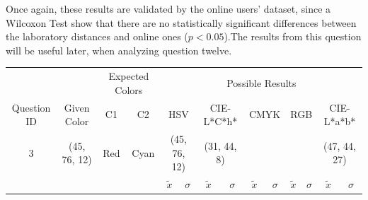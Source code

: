 %
Once again, these results are validated by the online users' dataset, since a Wilcoxon Test show that there are no statistically significant differences between the laboratory
distances and online ones ($p < 0.05$).The results from this question will be useful later, when analyzing question twelve.
%
\begin{table}[H]
  \resizebox{\textwidth}{!} {
  \begin{tabular}{lccccccccccccc}
    \hline
    \multicolumn{1}{c}{}                              &                                      & \multicolumn{2}{c}{Expected Colors}                   & \multicolumn{10}{c}{Possible Results}                                                                                                                                                                                                                                                                                        \\ \cline{3-14}
    \multicolumn{1}{c}{\multirow{-2}{*}{Question ID}} & \multirow{-2}{*}{Given Color}        & C1                       & C2                         & \multicolumn{2}{c}{HSV}                                        & \multicolumn{2}{c}{CIE-L*C*h*}                                 & \multicolumn{2}{c}{CMYK}                                       & \multicolumn{2}{c}{RGB}                                        & \multicolumn{2}{c}{CIE-L*a*b*}                                 \\ \hline
    \multicolumn{1}{c}{3}                             & \cellcolor[HTML]{80FF00}(45, 76, 12) & \multicolumn{1}{c|}{Red} & \multicolumn{1}{c|}{Cyan}  & \multicolumn{2}{c|}{\cellcolor[HTML]{80FF00}(45, 76, 12)}      & \multicolumn{2}{c|}{\cellcolor[HTML]{91C01D}(31, 44, 8)}       & \multicolumn{2}{c|}{\cellcolor[HTML]{808080}{\color[HTML]{FFFFFF}(21, 22, 24)}}       & \multicolumn{2}{c|}{\cellcolor[HTML]{808080}{\color[HTML]{FFFFFF}(21, 22, 24)}}       & \multicolumn{2}{c|}{\cellcolor[HTML]{DDA581}(47, 44, 27)}       \\ \hline
                                                      & \multicolumn{1}{l}{}                 & \multicolumn{1}{l}{}     & \multicolumn{1}{l}{}       & \multicolumn{1}{c}{$\tilde{x}$} & \multicolumn{1}{c}{$\sigma$} & \multicolumn{1}{c}{$\tilde{x}$} & \multicolumn{1}{c}{$\sigma$} & \multicolumn{1}{c}{$\tilde{x}$} & \multicolumn{1}{c}{$\sigma$} & \multicolumn{1}{c}{$\tilde{x}$} & \multicolumn{1}{c}{$\sigma$} & \multicolumn{1}{c}{$\tilde{x}$} & \multicolumn{1}{c}{$\sigma$} \\ \hline

\end{tabular}}
\end{table}
